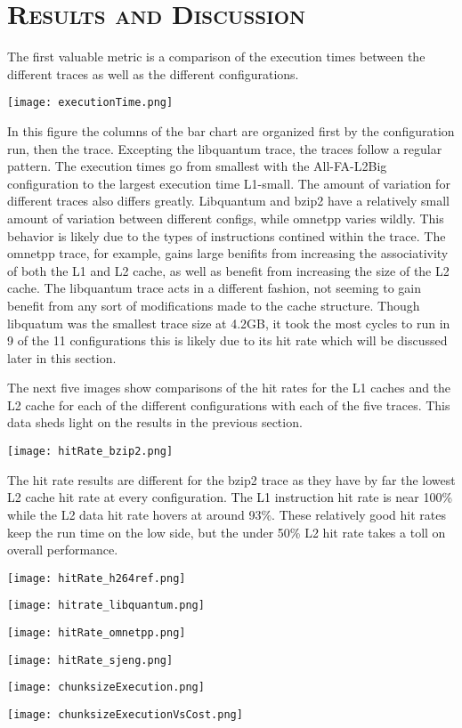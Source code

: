 \documentclass[cacheSimReport.tex]{subfiles}
\begin{document}
\section*{\textsc{\Large Results and Discussion}}

The first valuable metric is a comparison of the execution times between the different traces as well as the different configurations.

\smallskip

\hspace{-.9cm}\texttt{[image: executionTime.png]}

\pagebreak

In this figure the columns of the bar chart are organized first by the configuration run, then the trace. Excepting the libquantum trace, the traces follow a regular pattern. The execution times go from smallest with the All-FA-L2Big configuration to the largest execution time L1-small. The amount of variation for different traces also differs greatly. Libquantum and bzip2 have a relatively small amount of variation between different configs, while omnetpp varies wildly. This behavior is likely due to the types of instructions contined within the trace. The omnetpp trace, for example, gains large benifits from increasing the associativity of both the L1 and L2 cache, as well as benefit from increasing the size of the L2 cache. The libquantum trace acts in a different fashion, not seeming to gain benefit from any sort of modifications made to the cache structure. Though libquatum was the smallest trace size at 4.2GB, it took the most cycles to run in 9 of the 11 configurations this is likely due to its hit rate which will be discussed later in this section.

\smallspace

The next five images show comparisons of the hit rates for the L1 caches and the L2 cache for each of the different configurations with each of the five traces. This data sheds light on the results in the previous section.

\hspace{-.9cm}\texttt{[image: hitRate\_bzip2.png]}

The hit rate results are different for the bzip2 trace as they have by far the lowest L2 cache hit rate at every configuration. The L1 instruction hit rate is near 100\% while the L2 data hit rate hovers at around 93\%. These relatively good hit rates keep the run time on the low side, but the under 50\% L2 hit rate takes a toll on overall performance.

\hspace{-.9cm}\texttt{[image: hitRate\_h264ref.png]}

\hspace{-.9cm}\texttt{[image: hitrate\_libquantum.png]}

\hspace{-.9cm}\texttt{[image: hitRate\_omnetpp.png]}

\hspace{-.9cm}\texttt{[image: hitRate\_sjeng.png]}

\hspace{-.9cm}\texttt{[image: chunksizeExecution.png]}

\hspace{-.9cm}\texttt{[image: chunksizeExecutionVsCost.png]}
\end{document}
